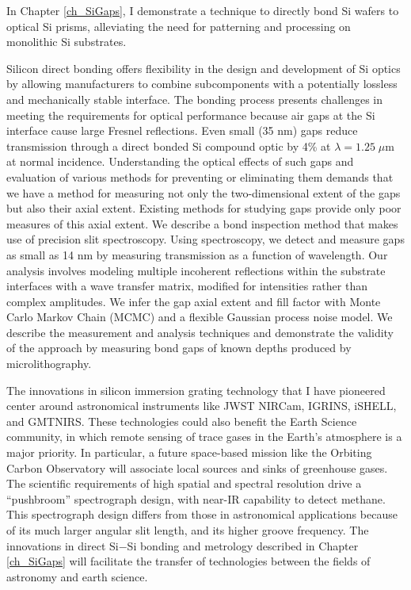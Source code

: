 In Chapter \ref{ch_SiGaps}, I demonstrate a technique to directly bond Si wafers to optical Si prisms, alleviating the need for patterning and processing on monolithic Si substrates.

Silicon direct bonding offers flexibility in the design and development of Si optics by allowing manufacturers to combine subcomponents with a potentially lossless and mechanically stable interface. The bonding process presents challenges in meeting the requirements for optical performance because air gaps at the Si interface cause large Fresnel reflections. Even small (35 nm) gaps reduce transmission through a direct bonded Si compound optic by 4\% at $\lambda = 1.25 \; \mu$m at normal incidence. Understanding the optical effects of such gaps and evaluation of various methods for preventing or eliminating them demands that we have a method for measuring not only the two-dimensional extent of the gaps but also their axial extent.  Existing methods for studying gaps provide only poor measures of this axial extent.  We describe a bond inspection method that makes use of precision slit spectroscopy.  Using spectroscopy, we detect and measure gaps as small as 14 nm by measuring transmission as a function of wavelength. Our analysis involves modeling multiple incoherent reflections within the substrate interfaces with a wave transfer matrix, modified for intensities rather than complex amplitudes. We infer the gap axial extent and fill factor with Monte Carlo Markov Chain (MCMC) and a flexible Gaussian process noise model.  We describe the measurement and analysis techniques and demonstrate the validity of the approach by measuring bond gaps of known depths produced by microlithography.


The innovations in silicon immersion grating technology that I have pioneered center around astronomical instruments like JWST NIRCam, IGRINS, iSHELL, and GMTNIRS.  These technologies could also benefit the Earth Science community, in which remote sensing of trace gases in the Earth's atmosphere is a major priority.  In particular, a future space-based mission like the Orbiting Carbon Observatory will associate local sources and sinks of greenhouse gases.  The scientific requirements of high spatial and spectral resolution drive a ``pushbroom'' spectrograph design, with near-IR capability to detect methane.  This spectrograph design differs from those in astronomical applications because of its much larger angular slit length, and its higher groove frequency.  The innovations in direct Si$-$Si bonding and metrology described in Chapter \ref{ch_SiGaps} will facilitate the transfer of technologies between the fields of astronomy and earth science.  



